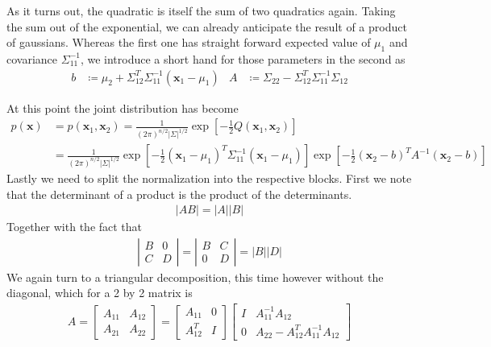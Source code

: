\documentclass{article}
\begin{document}
As it turns out, the quadratic is itself the sum of two quadratics again. Taking the sum out of the exponential, we can already anticipate the result of a product of gaussians. Whereas the first one has straight forward expected value of $\mu_1$ and covariance $\Sigma_{11}^{-1}$, we introduce a short hand for those parameters in the second as
\begin{align*}
b &\coloneqq \mu_{2}+\Sigma_{12}^{T} \Sigma_{11}^{-1}\left(\mathbf{x}_{1}-\mu_{1}\right)
  & A &\coloneqq \Sigma_{22}-\Sigma_{12}^{T} \Sigma_{11}^{-1} \Sigma_{12}
\end{align*}

At this point the joint distribution has become
\begin{align*}
p(\mathbf{x})&=p\left(\mathbf{x}_{1}, \mathbf{x}_{2}\right)=\frac{1}{(2 \pi)^{n / 2}|\Sigma|^{1 / 2}} \exp \left[-\frac{1}{2} Q\left(\mathbf{x}_{1}, \mathbf{x}_{2}\right)\right] \\
&= \frac{1}{(2 \pi)^{n / 2}|\Sigma|^{1 / 2}}\exp \left[-\frac{1}{2}\left(\mathbf{x}_{1}-\mu_{1}\right)^{T} \Sigma_{11}^{-1}\left(\mathbf{x}_{1}-\mu_{1}\right)\right] \exp \left[-\frac{1}{2}\left(\mathbf{x}_{2}-b\right)^{T} A^{-1}\left(\mathbf{x}_{2}-b\right)\right]
\end{align*}
Lastly we need to split the normalization into the respective blocks. First we note that the determinant of a product is the product of the determinants.
\begin{align*}
|A B|=|A||B|
\end{align*}
Together with the fact that
\begin{align*}
\left| \begin{array}{cc}{B} & {0} \\ {C} & {D}\end{array}\right|=\left| \begin{array}{cc}{B} & {C} \\ {0} & {D}\end{array}\right|=|B||D|
\end{align*}
We again turn to a triangular decomposition, this time however without the diagonal, which for a 2 by 2 matrix is
\begin{align*}
A=\left[ \begin{array}{ll}{A_{11}} & {A_{12}} \\ {A_{21}} & {A_{22}}\end{array}\right]=\left[ \begin{array}{cc}{A_{11}} & {0} \\ {A_{12}^{T}} & {I}\end{array}\right] \left[ \begin{array}{cc}{I} & {A_{11}^{-1} A_{12}} \\ {0} & {A_{22}-A_{12}^{T} A_{11}^{-1} A_{12}}\end{array}\right]
\end{align*}
\end{document}
